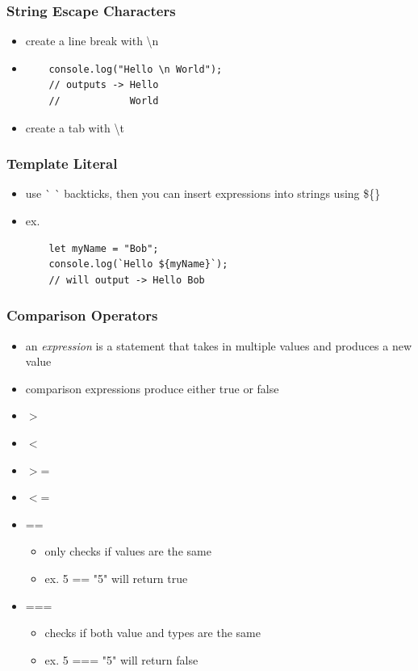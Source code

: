 \documentclass{beamer}
\begin{document}
\begin{frame}[fragile]
\frametitle{String Escape Characters}
\begin{itemize}
	\item create a line break with \textbackslash n 
	\item \begin{lstlisting}
	console.log("Hello \n World");
	// outputs -> Hello
	//            World
	\end{lstlisting}
	\item create a tab with \textbackslash t
\end{itemize}
\end{frame}

\begin{frame}[fragile]
\frametitle{Template Literal}
\begin{itemize}
	\item use \`{} \`{} backticks, then you can insert expressions into strings using \$\{\} 
	\item ex. \begin{lstlisting}
	let myName = "Bob";
	console.log(`Hello ${myName}`);
	// will output -> Hello Bob
	\end{lstlisting}
\end{itemize}
\end{frame}

\begin{frame}
\frametitle{Comparison Operators}
\begin{itemize}
	\item an \emph{expression} is a statement that takes in multiple values and produces a new value
	\item comparison expressions produce either true or false
	\item \(>\)  
	\item \(<\)
	\item \(>\)= 
	\item \(<\)=
	\item ==
		\begin{itemize}
			\item only checks if values are the same 
			\item ex. 5 == "5" will return true
		\end{itemize}
	\item ===
		\begin{itemize}
			\item checks if both value and types are the same
			\item ex. 5 === "5" will return false
		\end{itemize}
\end{itemize}
\end{frame}
\end{document}
